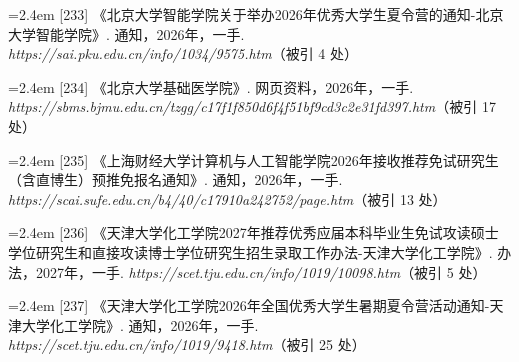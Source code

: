 {\vspace{0.6pt}
\vspace{3.5pt}\par
\nopagebreak\vspace{1pt}
\noindent\hangindent=2.4em \label{src:S0299}{\color{cAccent}[233]} 《北京大学智能学院关于举办2026年优秀大学生夏令营的通知-北京大学智能学院》. 通知，2026年，一手. \textit{https://sai.pku.edu.cn/info/1034/9575.htm}（被引 4 处）\par
\vspace{0.6pt}
\vspace{3.5pt}\par
\nopagebreak\vspace{1pt}
\noindent\hangindent=2.4em \label{src:S0301}{\color{cAccent}[234]} 《北京大学基础医学院》. 网页资料，2026年，一手. \textit{https://sbms.bjmu.edu.cn/tzgg/c17f1f850d6f4f51bf9cd3c2e31fd397.htm}（被引 17 处）\par
\vspace{0.6pt}
\vspace{3.5pt}\par
\nopagebreak\vspace{1pt}
\noindent\hangindent=2.4em \label{src:S0302}{\color{cAccent}[235]} 《上海财经大学计算机与人工智能学院2026年接收推荐免试研究生（含直博生）预推免报名通知》. 通知，2026年，一手. \textit{https://scai.sufe.edu.cn/b4/40/c17910a242752/page.htm}（被引 13 处）\par
\vspace{0.6pt}
\vspace{3.5pt}\par
\nopagebreak\vspace{1pt}
\noindent\hangindent=2.4em \label{src:S0303}{\color{cAccent}[236]} 《天津大学化工学院2027年推荐优秀应届本科毕业生免试攻读硕士学位研究生和直接攻读博士学位研究生招生录取工作办法-天津大学化工学院》. 办法，2027年，一手. \textit{https://scet.tju.edu.cn/info/1019/10098.htm}（被引 5 处）\par
\vspace{0.6pt}
\noindent\hangindent=2.4em \label{src:S0304}{\color{cAccent}[237]} 《天津大学化工学院2026年全国优秀大学生暑期夏令营活动通知-天津大学化工学院》. 通知，2026年，一手. \textit{https://scet.tju.edu.cn/info/1019/9418.htm}（被引 25 处）\par
\vspace{0.6pt}
}
